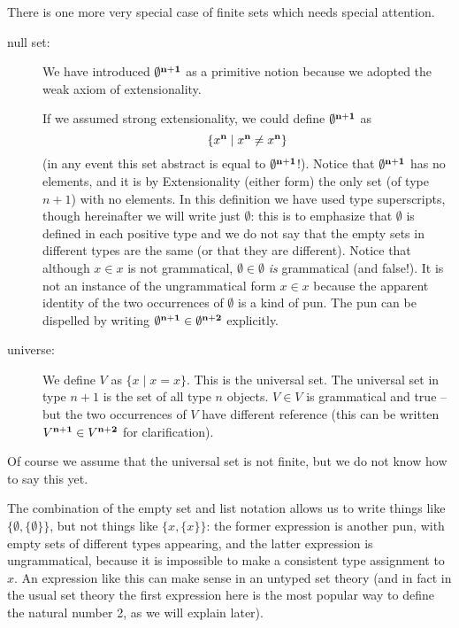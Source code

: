 \documentclass[12pt]{book}
\begin{document}
There is one more very special case of finite sets which needs special
attention.

\begin{description}

\item[null set:] We have introduced $\emptyset^{\bf n+1}$ as a primitive notion
because we adopted the weak axiom of extensionality.

If we assumed strong extensionality, we could define $\emptyset^{\bf
n+1}$ as $$\{x^{\bf n} \mid x^{\bf n} \neq x^{\bf n}\}$$ (in any event
this set abstract is equal to $\emptyset^{\bf n+1}$!).  Notice that
$\emptyset^{\bf n+1}$ has no elements, and it is by Extensionality
(either form) the only set (of type $n+1$) with no elements.  In this
definition we have used type superscripts, though hereinafter we will
write just $\emptyset$: this is to emphasize that $\emptyset$ is
defined in each positive type and we do not say that the empty sets in
different types are the same (or that they are different).  Notice
that although $x \in x$ is not grammatical, $\emptyset \in \emptyset$
{\em is\/} grammatical (and false!).  It is not an instance of the
ungrammatical form $x \in x$ because the apparent identity of the two
occurrences of $\emptyset$ is a kind of pun.  The pun can be dispelled
by writing $\emptyset^{\bf n+1} \in \emptyset^{\bf n+2}$ explicitly.

\item[universe:] We define $V$ as $\{x \mid x=x\}$.  This is the
universal set.  The universal set in type $n+1$ is the set of all type
$n$ objects.  $V \in V$ is grammatical and true -- but the two
occurrences of $V$ have different reference (this can be written
$V^{\bf n+1} \in V^{\bf n+2}$ for clarification).

\end{description}

Of course we assume that the universal set is not finite, but we do
not know how to say this yet.

The combination of the empty set and list notation allows us to write
things like $\{\emptyset,\{\emptyset\}\}$, but not things like
$\{x,\{x\}\}$: the former expression is another pun, with empty sets
of different types appearing, and the latter expression is
ungrammatical, because it is impossible to make a consistent type
assignment to $x$.  An expression like this can make sense in an
untyped set theory (and in fact in the usual set theory the first
expression here is the most popular way to define the natural number 2, as we
will explain later).
\end{document}
